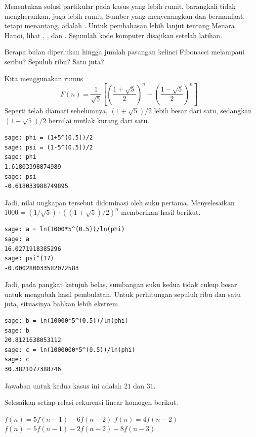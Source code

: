 Menentukan solusi partikular pada kasus yang lebih rumit, barangkali tidak
mengherankan, juga lebih rumit.
Sumber yang menyenangkan dan bermanfaat, tetapi menantang, adalah
\cite{GrahamKnuthPatashnik}.
Untuk pembahasan lebih lanjut tentang Menara Hanoi, lihat \cite{Ball},
\cite{Gardner57}, dan \cite{Hofstadter}.
Sejumlah kode komputer disajikan setelah latihan.

\begin{exercises}
  \item 
   Berapa bulan diperlukan hingga jumlah pasangan kelinci Fibonacci
   melampaui seribu?
   Sepuluh ribu?
   Satu juta?
   \begin{answer}
     Kita menggunakan rumus
     \begin{equation*}
       F(n)=\frac{1}{\sqrt{5}}\left[\left(\frac{1+\sqrt{5}}{2}\right)^{n}
                               -\left(\frac{1-\sqrt{5}}{2}\right)^{n}\right]
     \end{equation*}
     Seperti telah diamati sebelumnya, $(1+\sqrt{5})/2$ lebih besar dari satu,
     sedangkan $(1-\sqrt{5})/2$ bernilai mutlak kurang dari satu.
\begin{lstlisting}
sage: phi = (1+5^(0.5))/2
sage: psi = (1-5^(0.5))/2
sage: phi
1.61803398874989
sage: psi
-0.618033988749895       
\end{lstlisting}
     Jadi, nilai ungkapan tersebut didominasi oleh suku pertama.
     Menyelesaikan $1000=(1/\sqrt{5})\cdot ((1+\sqrt{5})/2)^n$
     memberikan hasil berikut.
\begin{lstlisting}
sage: a = ln(1000*5^(0.5))/ln(phi)
sage: a
16.0271918385296
sage: psi^(17)
-0.000280033582072583       
\end{lstlisting}
   Jadi, pada pangkat ketujuh belas, sumbangan suku kedua tidak cukup besar
   untuk mengubah hasil pembulatan.
   Untuk perhitungan sepuluh ribu dan satu juta, situasinya bahkan lebih
   ekstrem.
\begin{lstlisting}
sage: b = ln(10000*5^(0.5))/ln(phi)
sage: b
20.8121638053112
sage: c = ln(1000000*5^(0.5))/ln(phi)
sage: c
30.3821077388746    
\end{lstlisting}
   Jawaban untuk kedua kasus ini adalah $21$ dan $31$.
   \end{answer}
  \item 
   Selesaikan setiap relasi rekurensi linear homogen berikut.
   \begin{exparts}
     \partsitem $f(n)=5f(n-1)-6f(n-2)$   
     \partsitem $f(n)=4f(n-2)$   
     \partsitem $f(n)=5f(n-1)-2f(n-2)-8f(n-3)$   
   \end{exparts}

\end{exercises}
